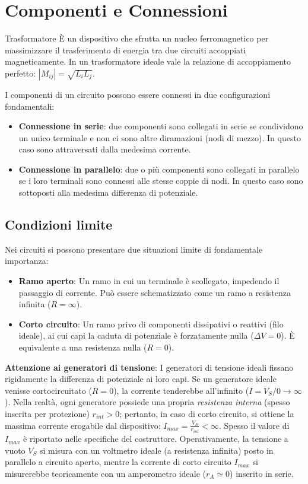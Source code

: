 \section{Componenti e Connessioni}

\begin{definizione}{Trasformatore}
È un dispositivo che sfrutta un nucleo ferromagnetico per massimizzare il trasferimento di energia tra due circuiti accoppiati magneticamente. In un trasformatore ideale vale la relazione di accoppiamento perfetto: $|M_{ij}| = \sqrt{L_i L_j}$.
\end{definizione}

I componenti di un circuito possono essere connessi in due configurazioni fondamentali:
\begin{itemize}[label=$\triangleright$]
    \item \textbf{Connessione in serie}: due componenti sono collegati in serie se condividono un unico terminale e non ci sono altre diramazioni (nodi di mezzo). In questo caso sono attraversati dalla medesima corrente.
    \item \textbf{Connessione in parallelo}: due o più componenti sono collegati in parallelo se i loro terminali sono connessi alle stesse coppie di nodi. In questo caso sono sottoposti alla medesima differenza di potenziale.
\end{itemize}

\subsection*{Condizioni limite}
Nei circuiti si possono presentare due situazioni limite di fondamentale importanza:
\begin{itemize}[label=$\triangleright$]
    \item \textbf{Ramo aperto}: Un ramo in cui un terminale è scollegato, impedendo il passaggio di corrente. Può essere schematizzato come un ramo a resistenza infinita ($R=\infty$).
    \item \textbf{Corto circuito}: Un ramo privo di componenti dissipativi o reattivi (filo ideale), ai cui capi la caduta di potenziale è forzatamente nulla ($\Delta V=0$). È equivalente a una resistenza nulla ($R=0$).
\end{itemize}

\textbf{Attenzione ai generatori di tensione}: I generatori di tensione ideali fissano rigidamente la differenza di potenziale ai loro capi. Se un generatore ideale venisse cortocircuitato ($R=0$), la corrente tenderebbe all'infinito ($I = V_S / 0 \to \infty$). Nella realtà, ogni generatore possiede una propria \textit{resistenza interna} (spesso inserita per protezione) $r_{int} > 0$; pertanto, in caso di corto circuito, si ottiene la massima corrente erogabile dal dispositivo: $I_{max} = \frac{V_S}{r_{int}} < \infty$. Spesso il valore di $I_{max}$ è riportato nelle specifiche del costruttore. Operativamente, la tensione a vuoto $V_S$ si misura con un voltmetro ideale (a resistenza infinita) posto in parallelo a circuito aperto, mentre la corrente di corto circuito $I_{max}$ si misurerebbe teoricamente con un amperometro ideale ($r_A \simeq 0$) inserito in serie.

